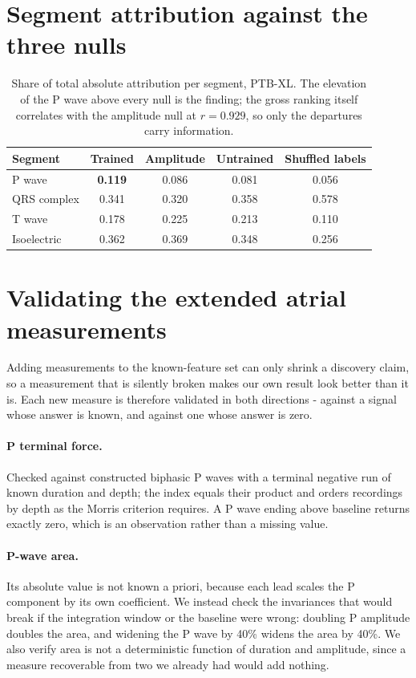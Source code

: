 \documentclass{article}
\begin{document}
\section{Segment attribution against the three nulls}
\label{app:nulls}

\begin{table}[h]
\centering
\caption{Share of total absolute attribution per segment, PTB-XL. The elevation
of the P wave above every null is the finding; the gross ranking itself
correlates with the amplitude null at $r = 0.929$, so only the departures carry
information.}
\small
\begin{tabular}{lcccc}
\toprule
Segment & Trained & Amplitude & Untrained & Shuffled labels \\
\midrule
P wave & \textbf{0.119} & 0.086 & 0.081 & 0.056 \\
QRS complex & 0.341 & 0.320 & 0.358 & 0.578 \\
T wave & 0.178 & 0.225 & 0.213 & 0.110 \\
Isoelectric & 0.362 & 0.369 & 0.348 & 0.256 \\
\bottomrule
\end{tabular}
\end{table}

\section{Validating the extended atrial measurements}
\label{app:atrial}

Adding measurements to the known-feature set can only shrink a discovery claim,
so a measurement that is silently broken makes our own result look better than it
is. Each new measure is therefore validated in both directions - against a signal
whose answer is known, and against one whose answer is zero.

\paragraph{P terminal force.} Checked against constructed biphasic P waves with a
terminal negative run of known duration and depth; the index equals their product
and orders recordings by depth as the Morris criterion requires. A P wave ending
above baseline returns exactly zero, which is an observation rather than a
missing value.

\paragraph{P-wave area.} Its absolute value is not known a priori, because each
lead scales the P component by its own coefficient. We instead check the
invariances that would break if the integration window or the baseline were
wrong: doubling P amplitude doubles the area, and widening the P wave by 40\%
widens the area by 40\%. We also verify area is not a deterministic function of
duration and amplitude, since a measure recoverable from two we already had
would add nothing.
\end{document}
